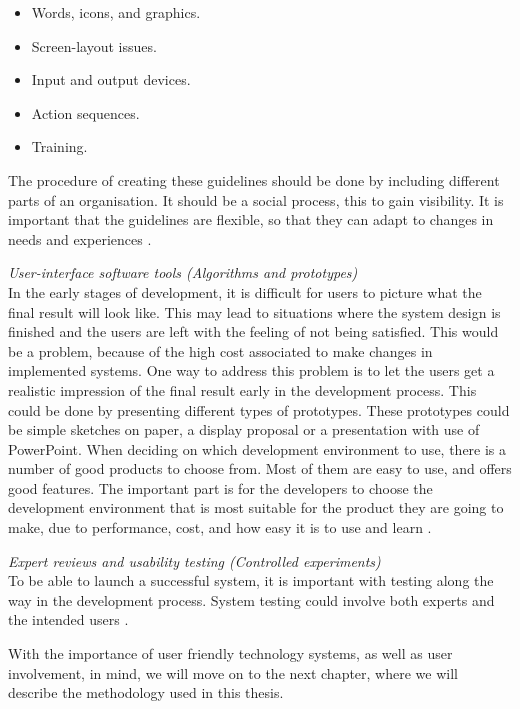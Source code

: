 \begin{itemize}
\renewcommand{\labelitemi}{$\bullet$}
\item Words, icons, and graphics.
\item Screen-layout issues.
\item Input and output devices.
\item Action sequences.
\item Training.
\end{itemize}

The procedure of creating these guidelines should be done by including different parts of an organisation. It should be a social process, this to gain visibility. It is important that the guidelines are flexible, so that they can adapt to changes in needs and experiences \cite{mmi}. 


\emph{User-interface software tools (Algorithms and prototypes)}\\
In the early stages of development, it is difficult for users to picture what the final result will look like. This may lead to situations where the system design is finished and the users are left with the feeling of not being satisfied. This would be a problem, because of the high cost associated to make changes in implemented systems. One way to address this problem is to let the users get a realistic impression of the final result early in the development process. This could be done by presenting different types of prototypes. These prototypes could be simple sketches on paper, a display proposal or a presentation with use of PowerPoint. 
When deciding on which development environment to use, there is a number of good products to choose from. Most of them are easy to use, and offers good features. The important part is for the developers to choose the development environment that is most suitable for the product they are going to make, due to performance, cost, and how easy it is to use and learn \cite{mmi}.
	

\emph{Expert reviews and usability testing (Controlled experiments)}\\
To be able to launch a successful system, it is important with testing along the way in the development process. System testing could involve both experts and the intended users \cite{mmi}. 

With the importance of user friendly technology systems, as well as user involvement, in mind, we will move on to the next chapter, where we will describe the methodology used in this thesis. 